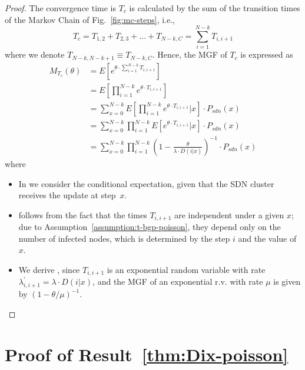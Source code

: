 \begin{proof}
The convergence time is $T_{c}$ is calculated by the sum of the transition times of the Markov Chain of Fig.~\ref{fig:mc-steps}, i.e., 
\begin{equation}
T_{c} = T_{1,2} + T_{2,3} + ... + T_{N-k,C} = \sum_{i =1}^{N-k} T_{i,i+1}
\end{equation}
where we denote $T_{N-k,N-k+1}\equiv T_{N-k,C}$. Hence, the MGF of $T_{c}$ is expressed as
\begin{align}
M_{T_{c}}(\theta) 
& = E\left[e^{\theta\cdot \sum_{i =1}^{N-k} T_{i,i+1}}\right] \\
& = E\left[\prod_{i =1}^{N-k} e^{\theta\cdot T_{i,i+1}}\right] \label{eq:mgf-expectation-of-product}\\
& = \sum_{x=0}^{N-k} E\left[\prod_{i =1}^{N-k} e^{\theta\cdot T_{i,i+1}} \Big| x\right] \cdot P_{sdn}(x) \label{eq:mgf-conditional-expectation}\\
& = \sum_{x=0}^{N-k} \prod_{i =1}^{N-k} E\left[ e^{\theta\cdot T_{i,i+1}} \Big| x\right] \cdot P_{sdn}(x) \label{eq:mgf-independency}\\
& = \sum_{x=0}^{N-k} \prod_{i =1}^{N-k} \left(1-\frac{\theta}{\lambda \cdot D(i|x)}\right)^{-1} \cdot P_{sdn}(x) \label{eq:mgf-exponential-variable}
\end{align}
where 
\begin{itemize}
\item In  we consider the conditional expectation, given that the SDN cluster receives the update at step~$x$.

\item  {} follows from the fact that the times $T_{i,i+1}$ are independent under a given $x$; due to Assumption~\ref{assumption:t-bgp-poisson}, they depend only on the number of infected nodes, which is determined by the step $i$ and the value of $x$. 

\item We derive , since $T_{i,i+1}$ is an exponential random variable with rate $\lambda_{i,i+1}^{'} = \lambda \cdot D(i|x)$, and the MGF of an exponential r.v. with rate $\mu$ is given by $\left(1-{\theta}/{\mu}\right)^{-1}$. 
\end{itemize}
\end{proof}


\section{Proof of Result~\ref{thm:Dix-poisson}}\label{sec:proof-of-thm-Dix-poisson}

